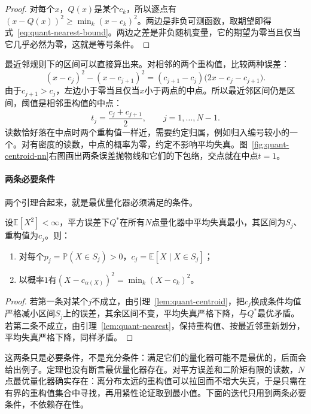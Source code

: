 \begin{proof}
对每个$x$，$Q(x)$是某个$c_k$，所以逐点有$(x-Q(x))^{2}\geq\min_k(x-c_k)^{2}$。两边是非负可测函数，取期望即得式~\eqref{eq:quant-nearest-bound}。两边之差是非负随机变量，它的期望为零当且仅当它几乎必然为零，这就是等号条件。
\end{proof}

最近邻规则下的区间可以直接算出来。对相邻的两个重构值，比较两种误差：
\[
 (x-c_j)^{2}-(x-c_{j+1})^{2}=(c_{j+1}-c_j)\bigl(2x-c_j-c_{j+1}\bigr) .
\]
由于$c_{j+1}>c_j$，左边小于零当且仅当$x$小于两点的中点。所以最近邻区间仍是区间，阈值是相邻重构值的中点：
\begin{equation}
 t_j=\frac{c_j+c_{j+1}}{2},\qquad j=1,\dots,N-1 .
 \label{eq:quant-midpoint-threshold}
\end{equation}
读数恰好落在中点时两个重构值一样近，需要约定归属，例如归入编号较小的一个。对有密度的读数，中点的概率为零，约定不影响平均失真。图~\ref{fig:quant-centroid-nn}右图画出两条误差抛物线和它们的下包络，交点就在中点$t=1$。

\paragraph{两条必要条件}
两个引理合起来，就是最优量化器必须满足的条件。

\begin{theorem}
\label{thm:quant-lloyd-max-conditions}
设$\mathbb{E}[X^{2}]<\infty$，平方误差下$Q^{*}$在所有$N$点量化器中平均失真最小，其区间为$S_j$、重构值为$c_j$。则：
\begin{enumerate}
 \item 对每个$p_j=\mathbb{P}(X\in S_j)>0$，$c_j=\mathbb{E}[X\mid X\in S_j]$；
 \item 以概率$1$有$(X-c_{\alpha(X)})^{2}=\min_k(X-c_k)^{2}$。
\end{enumerate}
\end{theorem}

\begin{proof}
若第一条对某个$j$不成立，由引理~\ref{lem:quant-centroid}，把$c_j$换成条件均值严格减小区间$S_j$上的误差，其余区间不变，平均失真严格下降，与$Q^{*}$最优矛盾。若第二条不成立，由引理~\ref{lem:quant-nearest}，保持重构值、按最近邻重新划分，平均失真严格下降，同样矛盾。
\end{proof}

这两条只是必要条件，不是充分条件：满足它们的量化器可能不是最优的，后面会给出例子。定理也没有断言最优量化器存在。对平方误差和二阶矩有限的读数，$N$点最优量化器确实存在：离分布太远的重构值可以拉回而不增大失真，于是只需在有界的重构值集合中寻找，再用紧性论证取到最小值。下面的迭代只用到两条必要条件，不依赖存在性。

